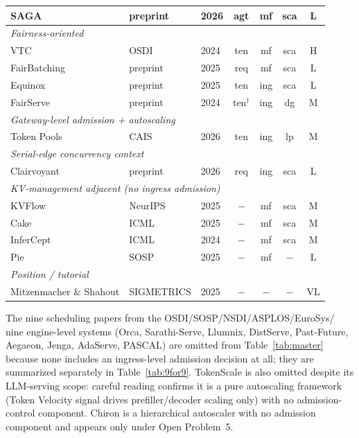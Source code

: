 \begin{table}[htbp]
{\begin{tabular}{l l l c c c c}
SAGA                    & preprint   & 2026 & agt & mf  & sca  & L \\
\midrule
\multicolumn{7}{l}{\textit{Fairness-oriented}} \\
VTC                     & OSDI       & 2024 & ten & mf  & sca  & H \\
FairBatching            & preprint   & 2025 & req & mf  & sca  & L \\
Equinox                 & preprint   & 2025 & ten & ing & sca  & L \\
FairServe               & preprint   & 2024 & ten$^\dagger$ & ing & dg  & M \\
\midrule
\multicolumn{7}{l}{\textit{Gateway-level admission + autoscaling}} \\
Token Pools             & CAIS       & 2026 & ten & ing & lp   & M \\
\midrule
\multicolumn{7}{l}{\textit{Serial-edge concurrency context}} \\
Clairvoyant             & preprint   & 2026 & req & ing & sca  & L \\
\midrule
\multicolumn{7}{l}{\textit{KV-management adjacent (no ingress admission)}} \\
KVFlow                  & NeurIPS    & 2025 & $-$ & mf  & sca  & M \\
Cake                    & ICML       & 2025 & $-$ & mf  & sca  & M \\
InferCept               & ICML       & 2024 & $-$ & mf  & sca  & M \\
Pie                     & SOSP       & 2025 & $-$ & mf  & $-$  & L \\
\midrule
\multicolumn{7}{l}{\textit{Position / tutorial}} \\
Mitzenmacher \& Shahout & SIGMETRICS & 2025 & $-$ & $-$ & $-$  & VL \\
\bottomrule
\end{tabular}%
}
\end{table}

The nine scheduling papers from the OSDI/SOSP/NSDI/ASPLOS/EuroSys/
nine engine-level systems (Orca, Sarathi-Serve, Llumnix,
DistServe, Past-Future, Aegaeon, Jenga, AdaServe, PASCAL) are
omitted from Table~\ref{tab:master} because none includes an
ingress-level admission decision at all; they are summarized
separately in Table~\ref{tab:9for9}. TokenScale
\citep{lai2025tokenscale} is also omitted despite its LLM-serving
scope: careful reading confirms it is a pure autoscaling framework
(Token Velocity signal drives prefiller/decoder scaling only) with
no admission-control component. Chiron \citep{patke2025chiron} is a
hierarchical autoscaler with no admission component and appears
only under Open Problem~5.

